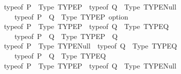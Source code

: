 \begin{isabellebody}
\isanewline
\ \ {\isachardoublequoteopen}typeof\ P\ {\isasymequiv}\ Type\ {\isacharparenleft}{\kern0pt}TYPE{\isacharparenleft}{\kern0pt}{\isacharprime}{\kern0pt}P{\isacharparenright}{\kern0pt}{\isacharparenright}{\kern0pt}\ {\isasymLongrightarrow}\ typeof\ Q\ {\isasymequiv}\ Type\ {\isacharparenleft}{\kern0pt}TYPE{\isacharparenleft}{\kern0pt}Null{\isacharparenright}{\kern0pt}{\isacharparenright}{\kern0pt}\ {\isasymLongrightarrow}\isanewline
\ \ \ \ \ typeof\ {\isacharparenleft}{\kern0pt}P\ {\isasymor}\ Q{\isacharparenright}{\kern0pt}\ {\isasymequiv}\ Type\ {\isacharparenleft}{\kern0pt}TYPE{\isacharparenleft}{\kern0pt}{\isacharprime}{\kern0pt}P\ option{\isacharparenright}{\kern0pt}{\isacharparenright}{\kern0pt}{\isachardoublequoteclose}\isanewline
\isanewline
\ \ {\isachardoublequoteopen}typeof\ P\ {\isasymequiv}\ Type\ {\isacharparenleft}{\kern0pt}TYPE{\isacharparenleft}{\kern0pt}{\isacharprime}{\kern0pt}P{\isacharparenright}{\kern0pt}{\isacharparenright}{\kern0pt}\ {\isasymLongrightarrow}\ typeof\ Q\ {\isasymequiv}\ Type\ {\isacharparenleft}{\kern0pt}TYPE{\isacharparenleft}{\kern0pt}{\isacharprime}{\kern0pt}Q{\isacharparenright}{\kern0pt}{\isacharparenright}{\kern0pt}\ {\isasymLongrightarrow}\isanewline
\ \ \ \ \ typeof\ {\isacharparenleft}{\kern0pt}P\ {\isasymor}\ Q{\isacharparenright}{\kern0pt}\ {\isasymequiv}\ Type\ {\isacharparenleft}{\kern0pt}TYPE{\isacharparenleft}{\kern0pt}{\isacharprime}{\kern0pt}P\ {\isacharplus}{\kern0pt}\ {\isacharprime}{\kern0pt}Q{\isacharparenright}{\kern0pt}{\isacharparenright}{\kern0pt}{\isachardoublequoteclose}\isanewline
\isanewline
\ \ {\isachardoublequoteopen}typeof\ P\ {\isasymequiv}\ Type\ {\isacharparenleft}{\kern0pt}TYPE{\isacharparenleft}{\kern0pt}Null{\isacharparenright}{\kern0pt}{\isacharparenright}{\kern0pt}\ {\isasymLongrightarrow}\ typeof\ Q\ {\isasymequiv}\ Type\ {\isacharparenleft}{\kern0pt}TYPE{\isacharparenleft}{\kern0pt}{\isacharprime}{\kern0pt}Q{\isacharparenright}{\kern0pt}{\isacharparenright}{\kern0pt}\ {\isasymLongrightarrow}\isanewline
\ \ \ \ \ typeof\ {\isacharparenleft}{\kern0pt}P\ {\isasymand}\ Q{\isacharparenright}{\kern0pt}\ {\isasymequiv}\ Type\ {\isacharparenleft}{\kern0pt}TYPE{\isacharparenleft}{\kern0pt}{\isacharprime}{\kern0pt}Q{\isacharparenright}{\kern0pt}{\isacharparenright}{\kern0pt}{\isachardoublequoteclose}\isanewline
\isanewline
\ \ {\isachardoublequoteopen}typeof\ P\ {\isasymequiv}\ Type\ {\isacharparenleft}{\kern0pt}TYPE{\isacharparenleft}{\kern0pt}{\isacharprime}{\kern0pt}P{\isacharparenright}{\kern0pt}{\isacharparenright}{\kern0pt}\ {\isasymLongrightarrow}\ typeof\ Q\ {\isasymequiv}\ Type\ {\isacharparenleft}{\kern0pt}TYPE{\isacharparenleft}{\kern0pt}Null{\isacharparenright}{\kern0pt}{\isacharparenright}{\kern0pt}\ {\isasymLongrightarrow}\isanewline

\end{isabellebody}
